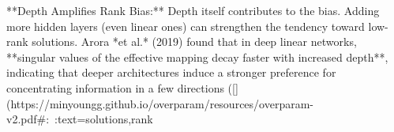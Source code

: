**Depth Amplifies Rank Bias:** Depth itself contributes to the bias. Adding more hidden layers (even linear ones) can strengthen the tendency toward low-rank solutions. Arora *et al.* (2019) found that in deep linear networks, **singular values of the effective mapping decay faster with increased depth**, indicating that deeper architectures induce a stronger preference for concentrating information in a few directions ([](https://minyoungg.github.io/overparam/resources/overparam-v2.pdf#:~:text=solutions,rank%

